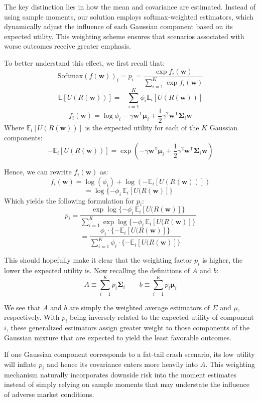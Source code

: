 The key distinction lies in how the mean and covariance are estimated. Instead of using sample moments, our solution employs softmax-weighted estimators, which dynamically adjust the influence of each Gaussian component based on its expected utility. This weighting scheme ensures that scenarios associated with worse outcomes receive greater emphasis. 

To better understand this effect, we first recall that:
$$\text{Softmax}(f(\mathbf{w}))_i=p_i=\frac{{\exp f_i(\mathbf{w})}}{\sum_{i=1}^{K}\exp f_i(\mathbf{w})}$$
$$\mathbb{E}[U(R(\mathbf{w}))]=-\sum_{i=1}^{K}\phi_{i}\mathbb{E}_{i}[U(R(\mathbf{w}))]$$
$$f_i(\mathbf{w})=\log{\phi_{i}}-\gamma\mathbf{w}^{\mathsf{T}}\mathbf{\mu}_i+\frac{1}{2}\gamma^2\mathbf{w}^{\mathsf{T}}\mathbf{\Sigma}_i\mathbf{w}$$
Where $\mathbb{E}_{i}[U(R(\mathbf{w}))]$ is the expected utility for each of the $K$ Gaussian components:
$$-\mathbb{E}_{i}[U(R(\mathbf{w}))]=\exp\left(-\gamma\mathbf{w}^{\mathsf{T}}\mathbf{\mu}_i+\frac{1}{2}\gamma^2\mathbf{w}^{\mathsf{T}}\mathbf{\Sigma}_i\mathbf{w}\right)$$

Hence, we can rewrite $f_i(\mathbf{w})$ as:
$$f_i(\mathbf{w})=\log{(\phi_i)}+\log{(-\mathbb{E}_{i}[U(R(\mathbf{w}))])}$$
$$=\log{\{-\phi_i\,\mathbb{E}_{i}[U(R(\mathbf{w})]\}}\;\,\,$$
Which yields the following formulation for $p_i$:
$$p_i=\frac{{\exp \log{\{-\phi_i\,\mathbb{E}_{i}[U(R(\mathbf{w})]\}}}}{\sum_{i=1}^{K}\exp \log{\{-\phi_i\,\mathbb{E}_{i}[U(R(\mathbf{w})]\}}}$$
$$=\frac{{\phi_i\cdot\{-\mathbb{E}_{i}[U(R(\mathbf{w})]\}}}{\sum_{i=1}^{K}\phi_i\cdot\{-\mathbb{E}_{i}[U(R(\mathbf{w})]\}}$$

This should hopefully make it clear that the weighting factor $p_i$ is higher, the lower the expected utility is. Now recalling the definitions of $A$ and $b$:
$$A\equiv\sum_{i=1}^{K}p_i\mathbf{\Sigma}_{i}\qquad b\equiv\sum_{i=1}^{K}p_i\mathbf{\mu}_i$$

We see that $A$ and $b$ are simply the weighted average estimators of $\Sigma$ and $\mu$, respectively. With $p_i$ being inversely related to the expected utility of component $i$, these generalized estimators assign greater weight to those components of the Gaussian mixture that are expected to yield the least favorable outcomes. 

If one Gaussian component corresponds to a fat-tail crash scenario, its low utility will inflate $p_i$ and hence its covariance enters more heavily into $A$. This weighting mechanism naturally incorporates downside risk into the moment estimates instead of simply relying on sample moments that may understate the influence of adverse market conditions.




